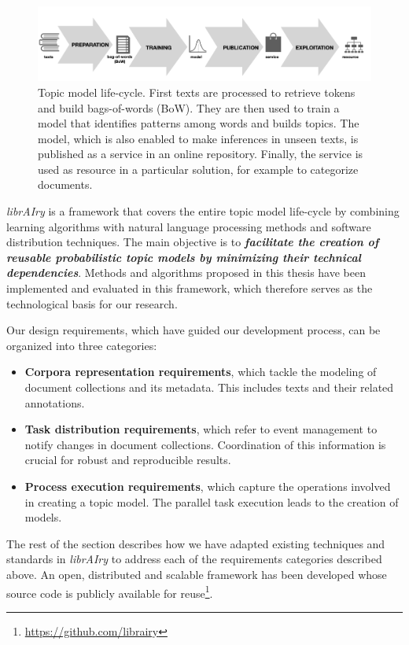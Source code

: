 \begin{figure}
  \center
  \includegraphics[scale=0.21]{life-cycle.png}
  \caption{Topic model life-cycle. First texts are processed to retrieve tokens and build bags-of-words (BoW). They are then used to train a model that identifies patterns among words and builds topics. The model, which is also enabled to make inferences in unseen texts, is published as a service in an online repository. Finally, the service is used as resource in a particular solution, for example to categorize documents.}
  \label{fig:life-cycle}
\end{figure}


\textit{librAIry} is a framework that covers the entire topic model life-cycle by combining learning algorithms with natural language processing methods and software distribution techniques. The main objective is to \textbf{\textit{facilitate the creation of reusable probabilistic topic models by minimizing their technical dependencies}}. Methods and algorithms proposed in this thesis have been implemented and evaluated in this framework, which therefore serves as the technological basis for our research.

Our design requirements, which have guided our development process, can be organized into three categories:
\begin{itemize}
\item \textbf{Corpora representation requirements}, which tackle the modeling of document collections and its metadata. This includes texts and their related annotations.
\item \textbf{Task distribution requirements}, which refer to event management to notify changes in document collections. Coordination of this information is crucial for robust and reproducible results.  
\item \textbf{Process execution requirements}, which capture the operations involved in creating a topic model. The parallel task execution leads to the creation of models.
\end{itemize}

The rest of the section describes how we have adapted existing techniques and standards in \textit{librAIry} to address each of the requirements categories described above. An open, distributed and scalable framework has been developed whose source code is publicly available for reuse\footnote{\url{https://github.com/librairy}}.

